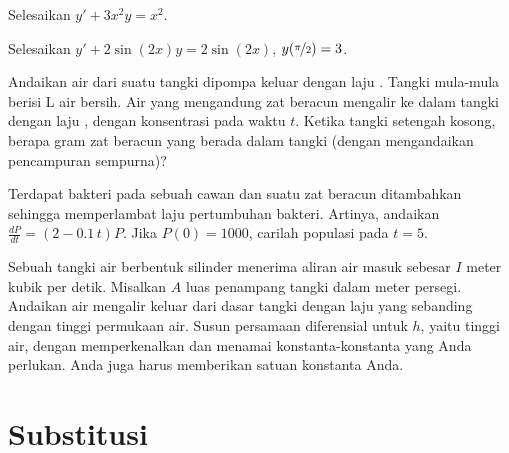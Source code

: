 \setcounter{exercise}{100}

\begin{exercise}
Selesaikan $y'+3 x^2 y = x^2$.
\end{exercise}

\begin{exercise}
Selesaikan $y'+ 2\sin(2x) y = 2\sin(2x)$, $y(\nicefrac{\pi}{2}) = 3$.
\end{exercise}

\begin{exercise}
Andaikan air dari suatu tangki dipompa keluar dengan laju . Tangki
mula-mula berisi \unit[10]{L} air bersih.
Air yang mengandung
zat beracun mengalir ke dalam tangki dengan laju ,
dengan konsentrasi  pada waktu $t$.
Ketika tangki setengah kosong, berapa gram zat beracun yang berada dalam
tangki (dengan mengandaikan pencampuran sempurna)?
\end{exercise}

\begin{exercise}
Terdapat bakteri pada sebuah cawan dan suatu zat beracun ditambahkan sehingga memperlambat
laju pertumbuhan bakteri.
Artinya,
andaikan $\frac{dP}{dt} = (2-0.1\,t)P$. Jika $P(0) = 1000$, carilah
populasi pada $t=5$.
\end{exercise}

\begin{exercise}
Sebuah tangki air berbentuk silinder menerima aliran air masuk sebesar $I$ meter kubik
per detik.
Misalkan $A$ luas penampang tangki dalam meter persegi.
Andaikan air
mengalir keluar dari dasar tangki dengan laju yang sebanding dengan tinggi
permukaan air. Susun persamaan diferensial untuk $h$, yaitu tinggi
air, dengan memperkenalkan dan menamai
konstanta-konstanta yang Anda perlukan. Anda juga harus memberikan satuan konstanta Anda.
\end{exercise}


\sectionnewpage
\section{Substitusi}
\label{substitution:section}

